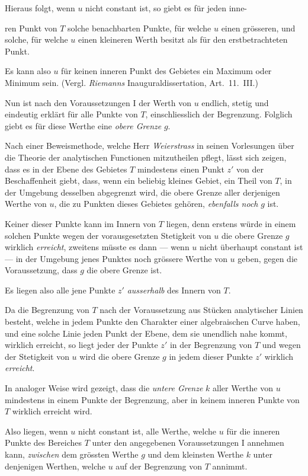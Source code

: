 \documentclass{article}
\begin{document}
Hieraus folgt, wenn $u$ nicht constant ist, so giebt es für jeden inne-

ren Punkt von $T$ solche benachbarten Punkte, für welche $u$ einen grösseren, und solche, für welche $u$ einen kleineren Werth besitzt als für den erstbetrachteten Punkt.

Es kann also $u$ für keinen inneren Punkt des Gebietes ein Maximum oder Minimum sein. (Vergl. \emph{Riemanns} Inauguraldissertation, Art.~11.~III.)

Nun ist nach den Voraussetzungen I der Werth von $u$ endlich, stetig und eindeutig erklärt für alle Punkte von $T$, einschliesslich der Begrenzung. Folglich giebt es für diese Werthe eine \emph{obere Grenze} $g$.

Nach einer Beweismethode, welche Herr \emph{Weierstrass} in seinen Vorlesungen über die Theorie der analytischen Functionen mitzutheilen pflegt, lässt sich zeigen, dass es in der Ebene des Gebietes $T$ mindestens einen Punkt $z'$ von der Beschaffenheit giebt, dass, wenn ein beliebig kleines Gebiet, ein Theil von $T$, in der Umgebung desselben abgegrenzt wird, die obere Grenze aller derjenigen Werthe von $u$, die zu Punkten dieses Gebietes gehören, \emph{ebenfalls noch} $g$ ist.

Keiner dieser Punkte kann im Innern von $T$ liegen, denn erstens würde in einem solchen Punkte wegen der vorausgesetzten Stetigkeit von $u$ die obere Grenze $g$ wirklich \emph{erreicht}, zweitens müsste es dann --- wenn $u$ nicht überhaupt constant ist --- in der Umgebung jenes Punktes noch grössere Werthe von $u$ geben, gegen die Voraussetzung, dass $g$ die obere Grenze ist.

Es liegen also alle jene Punkte $z'$ \emph{ausserhalb} des Innern von $T$.

Da die Begrenzung von $T$ nach der Voraussetzung aus Stücken analytischer Linien besteht, welche in jedem Punkte den Charakter einer algebraischen Curve haben, und eine solche Linie jeden Punkt der Ebene, dem sie unendlich nahe kommt, wirklich erreicht, so liegt jeder der Punkte $z'$ in der Begrenzung von $T$ und wegen der Stetigkeit von $u$ wird die obere Grenze $g$ in jedem dieser Punkte $z'$ wirklich \emph{erreicht}.

In analoger Weise wird gezeigt, dass die \emph{untere Grenze} $k$ aller Werthe von $u$ mindestens in einem Punkte der Begrenzung, aber in keinem inneren Punkte von $T$ wirklich erreicht wird.

Also liegen, wenn $u$ nicht constant ist, alle Werthe, welche $u$ für die inneren Punkte des Bereiches $T$ unter den angegebenen Voraussetzungen I annehmen kann, \emph{zwischen} dem grössten Werthe $g$ und dem kleinsten Werthe $k$ unter denjenigen Werthen, welche $u$ auf der Begrenzung von $T$ annimmt.
\end{document}
